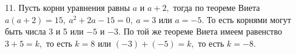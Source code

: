 11. Пусть корни уравнения равны $a$ и $a+2,$ тогда по теореме Виета $a(a+2)=15,\ a^2+2a-15=0,\ a=3$ или $a=-5.$ То есть корнями могут быть числа 3 и 5 или $-5$ и $-3.$ По той же теореме Виета имеем равенство $3+5=k,$ то есть $k=8$ или $(-3)+(-5)=k,$ то есть $k=-8.$\\
